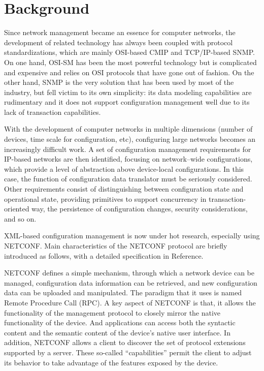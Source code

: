 \chapter{Background}
Since network management became an essence for computer networks, the development of related technology has always been coupled with protocol standardizations, which are mainly OSI-based CMIP and TCP/IP-based SNMP. On one hand, OSI-SM has been the most powerful technology but is complicated and expensive and relies on OSI protocols that have gone out of fashion. On the other hand, SNMP is the very solution that has been used by most of the industry, but fell victim to its own simplicity: its data modeling capabilities are rudimentary and it does not support configuration management well due to its lack of transaction capabilities.

With the development of computer networks in multiple dimensions (number of devices, time scale for configuration, etc), configuring large networks becomes an increasingly difficult work. A set of configuration management requirements for IP-based networks are then identified, focusing on network–wide configurations, which provide a level of abstraction above device-local configurations. In this case, the function of configuration data translator must be seriously considered. Other requirements consist of distinguishing between configuration state and operational state, providing primitives to support concurrency in transaction-oriented way, the persistence of configuration changes, security considerations, and so on.

XML-based configuration management is now under hot research, especially using NETCONF. Main characteristics of the NETCONF protocol are briefly introduced as follows, with a detailed specification in Reference.

NETCONF defines a simple mechanism, through which a network device can be managed, configuration data information can be retrieved, and new configuration data can be uploaded and manipulated. The paradigm that it uses is named Remote Procedure Call (RPC). A key aspect of NETCONF is that, it allows the functionality of the management protocol to closely mirror the native functionality of the device. And applications can access both the syntactic content and the semantic content of the device's native user interface. In addition, NETCONF allows a client to discover the set of protocol extensions supported by a server. These so-called “capabilities” permit the client to adjust its behavior to take advantage of the features exposed by the device.

